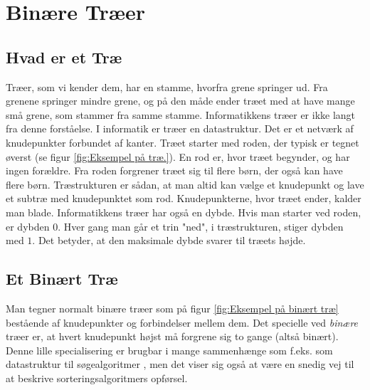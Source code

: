 \chapter{Binære Træer}
\label{ch:Binære Træer}


\section{Hvad er et Træ}
\label{sec:Hvad er et Træ}

Træer, som vi kender dem, har en stamme, hvorfra grene springer ud. Fra grenene springer mindre grene, og på den måde ender træet med at have mange små grene, som stammer fra samme stamme. Informatikkens træer er ikke langt fra denne forståelse. I informatik er træer en datastruktur. Det er et netværk af knudepunkter forbundet af kanter. Træet starter med roden, der typisk er tegnet øverst (se figur \ref{fig:Eksempel på træ.}). En rod er, hvor træet begynder, og har ingen forældre. Fra roden forgrener træet sig til flere børn, der også kan have flere børn. Træstrukturen er sådan, at man altid kan vælge et knudepunkt og lave et subtræ med knudepunktet som rod. Knudepunkterne, hvor træet ender, kalder man blade. Informatikkens træer har også en dybde. Hvis man starter ved roden, er dybden $0$. Hver gang man går et trin "ned", i træstrukturen, stiger dybden med $1$. Det betyder, at den maksimale dybde svarer til træets højde. \cite{trees}


\section{Et Binært Træ}
\label{sec:Et Binært Træ}

Man tegner normalt binære træer som på figur \ref{fig:Eksempel på binært træ} bestående af knudepunkter og forbindelser mellem dem. Det specielle ved \emph{binære} træer er, at hvert knudepunkt højst må forgrene sig to gange (altså binært). Denne lille specialisering er brugbar i mange sammenhænge som f.eks. som datastruktur til søgealgoritmer \cite{BST}, men det viser sig også at være en snedig vej til at beskrive sorteringsalgoritmers opførsel.

